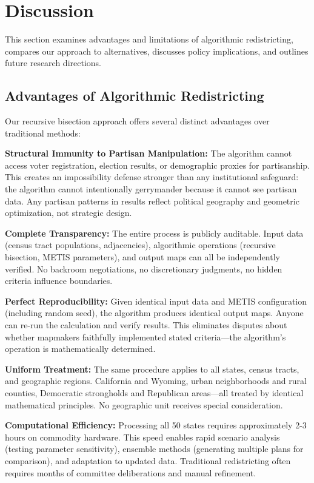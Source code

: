 \section{Discussion}
\label{sec:discussion}

This section examines advantages and limitations of algorithmic redistricting, compares our approach to alternatives, discusses policy implications, and outlines future research directions.

\subsection{Advantages of Algorithmic Redistricting}

Our recursive bisection approach offers several distinct advantages over traditional methods:

\textbf{Structural Immunity to Partisan Manipulation:} The algorithm cannot access voter registration, election results, or demographic proxies for partisanship. This creates an impossibility defense stronger than any institutional safeguard: the algorithm cannot intentionally gerrymander because it cannot see partisan data. Any partisan patterns in results reflect political geography and geometric optimization, not strategic design.

\textbf{Complete Transparency:} The entire process is publicly auditable. Input data (census tract populations, adjacencies), algorithmic operations (recursive bisection, METIS parameters), and output maps can all be independently verified. No backroom negotiations, no discretionary judgments, no hidden criteria influence boundaries.

\textbf{Perfect Reproducibility:} Given identical input data and METIS configuration (including random seed), the algorithm produces identical output maps. Anyone can re-run the calculation and verify results. This eliminates disputes about whether mapmakers faithfully implemented stated criteria—the algorithm's operation is mathematically determined.

\textbf{Uniform Treatment:} The same procedure applies to all states, census tracts, and geographic regions. California and Wyoming, urban neighborhoods and rural counties, Democratic strongholds and Republican areas—all treated by identical mathematical principles. No geographic unit receives special consideration.

\textbf{Computational Efficiency:} Processing all 50 states requires approximately 2-3 hours on commodity hardware. This speed enables rapid scenario analysis (testing parameter sensitivity), ensemble methods (generating multiple plans for comparison), and adaptation to updated data. Traditional redistricting often requires months of committee deliberations and manual refinement.

